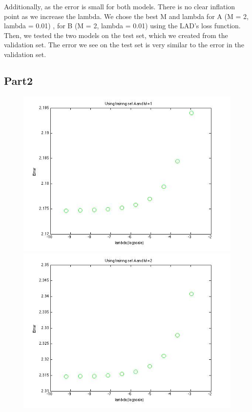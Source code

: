 Additionally, as the error is small for both models. There is no clear 
inflation point as we increase the lambda. We chose the best M and lambda
for A (M = 2, lambda = 0.01) , for B (M = 2, lambda = 0.01) using the LAD's loss function.  Then, we tested the two models on the test set, which we created from the validation set. 
The error we see on the test set is very similar to the error in the validation set. 


\subsection{Part2}

\begin{figure}[!htb]
  \includegraphics[width=\linewidth]{figures/p4_LASSO_regressA_m=1}
\endminipage\hfill
{}
  \includegraphics[width=\linewidth]{figures/p4_LASSO_regressA_m=2}

\end{figure}
